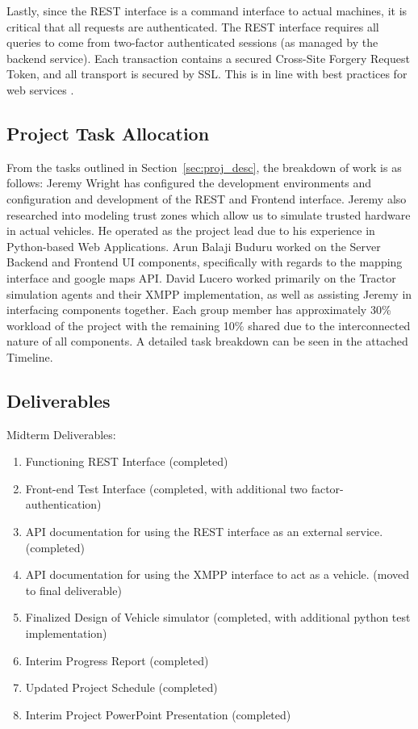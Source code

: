 \documentclass[conference,12pt]{IEEEtran}
\begin{document}
Lastly, since the REST interface is a command interface to actual machines, it
is critical that all requests are authenticated. The REST interface requires all
queries to come from two-factor authenticated sessions (as managed by the
backend service).  Each transaction contains a secured Cross-Site Forgery
Request Token, and all transport is secured by SSL. This is in line with best
practices for web services \autocite{ibm_best_2002}.

\subsection{Project Task Allocation}

From the tasks outlined in Section~\ref{sec:proj_desc}, the breakdown of work is as follows:
Jeremy Wright has configured the development environments and configuration and development of the REST and Frontend interface. Jeremy also researched into modeling trust zones which allow us to simulate trusted hardware in actual vehicles.  He operated as the project lead due to his experience in Python-based Web Applications.  Arun
Balaji Buduru worked on the Server Backend and Frontend UI components, specifically with regards to the mapping interface and google maps API. David Lucero worked primarily on the Tractor simulation agents and their XMPP implementation, as well as assisting Jeremy in interfacing components together. Each group member has approximately 30\% workload of the project with the remaining 10\% shared due to the interconnected nature of all
components. A detailed task breakdown can be seen in the attached Timeline.

\subsection{Deliverables}

Midterm Deliverables:
\begin{enumerate}
\item Functioning REST Interface (completed)
\item Front-end Test Interface (completed, with additional two factor-authentication)
\item API documentation for using the REST interface as an external service. (completed)
\item API documentation for using the XMPP interface to act as a vehicle. (moved to final deliverable)
\item Finalized Design of Vehicle simulator (completed, with additional python test implementation)
\item Interim Progress Report (completed)
\item Updated Project Schedule (completed)
\item Interim Project PowerPoint Presentation (completed)
\end{enumerate}
\end{document}
